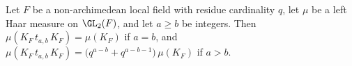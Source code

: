 Let $F$ be a non-archimedean local field with residue cardinality $q$, let $\mu$ be a left Haar measure on $\GL_2(F)$,
and let $a\ge b$ be integers. Then $\mu(K_F\,t_{a,b}\,K_F)=\mu(K_F)$ if $a=b$, and
$\mu(K_F\,t_{a,b}\,K_F)=\bigl(q^{a-b}+q^{a-b-1}\bigr)\,\mu(K_F)$ if $a>b$.
